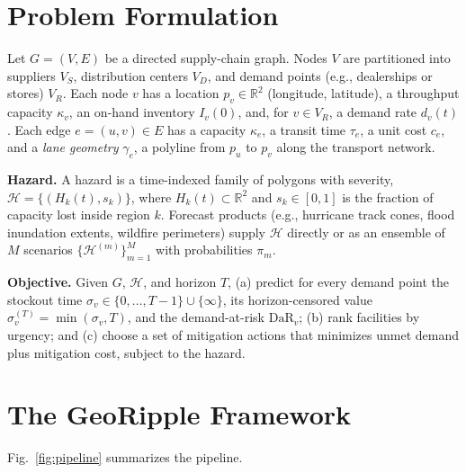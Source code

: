 \documentclass[conference]{IEEEtran}
\begin{document}
\section{Problem Formulation}
Let $G=(V,E)$ be a directed supply-chain graph. Nodes $V$ are partitioned
into suppliers $V_S$, distribution centers $V_D$, and demand points
(e.g., dealerships or stores) $V_R$. Each node $v$ has a location
$p_v\in\mathbb{R}^2$ (longitude, latitude), a throughput capacity
$\kappa_v$, an on-hand inventory $I_v(0)$, and, for $v\in V_R$, a demand
rate $d_v(t)$. Each edge $e=(u,v)\in E$ has a capacity $\kappa_e$, a
transit time $\tau_e$, a unit cost $c_e$, and a \emph{lane geometry}
$\gamma_e$, a polyline from $p_u$ to $p_v$ along the transport network.

\textbf{Hazard.} A hazard is a time-indexed family of polygons with
severity, $\mathcal{H}=\{(H_k(t), s_k)\}$, where $H_k(t)\subset
\mathbb{R}^2$ and $s_k\in[0,1]$ is the fraction of capacity lost inside
region $k$. Forecast products (e.g., hurricane track cones, flood
inundation extents, wildfire perimeters) supply $\mathcal{H}$ directly or
as an ensemble of $M$ scenarios $\{\mathcal{H}^{(m)}\}_{m=1}^{M}$ with
probabilities $\pi_m$.

\textbf{Objective.} Given $G$, $\mathcal{H}$, and horizon $T$, (a)
predict for every demand point the stockout time
$\sigma_v\in\{0,\dots,T-1\}\cup\{\infty\}$, its horizon-censored value
$\sigma_v^{(T)}=\min(\sigma_v,T)$, and the demand-at-risk
$\mathrm{DaR}_v$; (b) rank facilities by urgency; and (c) choose a set of
mitigation actions that minimizes unmet demand plus mitigation cost,
subject to the hazard.

\section{The GeoRipple Framework}
Fig.~\ref{fig:pipeline} summarizes the pipeline.
\end{document}
